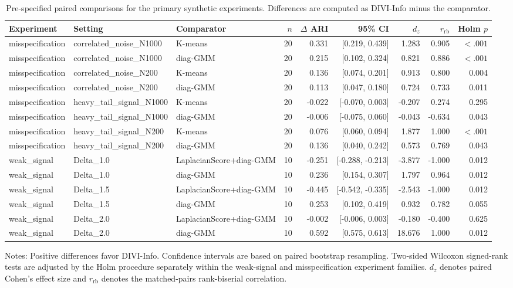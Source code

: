\begin{table}[t]
\centering
\footnotesize
\caption{Pre-specified paired comparisons for the primary synthetic experiments. Differences are computed as DIVI-Info minus the comparator.}
\label{tab:paired_primary}
\begin{tabular}{lllrrrrrr}
\toprule
Experiment & Setting & Comparator & $n$ & $\Delta$ ARI & 95\% CI & $d_z$ & $r_{\mathrm{rb}}$ & Holm $p$ \\
\midrule
misspecification & correlated\_noise\_N1000 & K-means & 20 & 0.331 & [0.219, 0.439] & 1.283 & 0.905 & $<.001$ \\
misspecification & correlated\_noise\_N1000 & diag-GMM & 20 & 0.215 & [0.102, 0.324] & 0.821 & 0.886 & $<.001$ \\
misspecification & correlated\_noise\_N200 & K-means & 20 & 0.136 & [0.074, 0.201] & 0.913 & 0.800 & 0.004 \\
misspecification & correlated\_noise\_N200 & diag-GMM & 20 & 0.113 & [0.047, 0.180] & 0.724 & 0.733 & 0.011 \\
misspecification & heavy\_tail\_signal\_N1000 & K-means & 20 & -0.022 & [-0.070, 0.003] & -0.207 & 0.274 & 0.295 \\
misspecification & heavy\_tail\_signal\_N1000 & diag-GMM & 20 & -0.006 & [-0.075, 0.060] & -0.043 & -0.634 & 0.043 \\
misspecification & heavy\_tail\_signal\_N200 & K-means & 20 & 0.076 & [0.060, 0.094] & 1.877 & 1.000 & $<.001$ \\
misspecification & heavy\_tail\_signal\_N200 & diag-GMM & 20 & 0.136 & [0.040, 0.242] & 0.573 & 0.769 & 0.043 \\
weak\_signal & Delta\_1.0 & LaplacianScore+diag-GMM & 10 & -0.251 & [-0.288, -0.213] & -3.877 & -1.000 & 0.012 \\
weak\_signal & Delta\_1.0 & diag-GMM & 10 & 0.236 & [0.154, 0.307] & 1.797 & 0.964 & 0.012 \\
weak\_signal & Delta\_1.5 & LaplacianScore+diag-GMM & 10 & -0.445 & [-0.542, -0.335] & -2.543 & -1.000 & 0.012 \\
weak\_signal & Delta\_1.5 & diag-GMM & 10 & 0.253 & [0.102, 0.419] & 0.932 & 0.782 & 0.055 \\
weak\_signal & Delta\_2.0 & LaplacianScore+diag-GMM & 10 & -0.002 & [-0.006, 0.003] & -0.180 & -0.400 & 0.625 \\
weak\_signal & Delta\_2.0 & diag-GMM & 10 & 0.592 & [0.575, 0.613] & 18.676 & 1.000 & 0.012 \\
\bottomrule
\end{tabular}
\begin{flushleft}
\footnotesize
Notes: Positive differences favor DIVI-Info. Confidence intervals are based on paired bootstrap resampling. Two-sided Wilcoxon signed-rank tests are adjusted by the Holm procedure separately within the weak-signal and misspecification experiment families. $d_z$ denotes paired Cohen's effect size and $r_{\mathrm{rb}}$ denotes the matched-pairs rank-biserial correlation.
\end{flushleft}
\end{table}